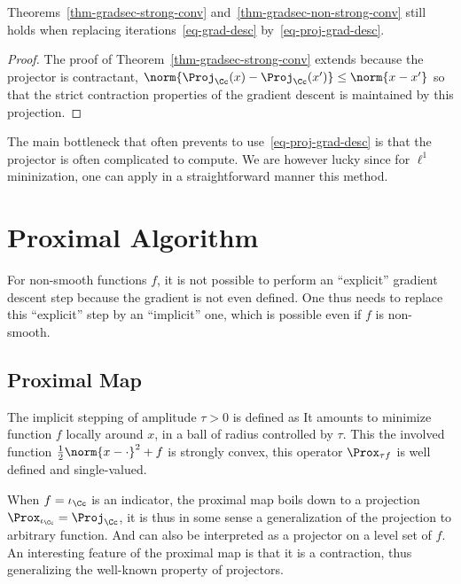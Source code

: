 \begin{thm}\label{thm-proj-grad}
	Theorems~\ref{thm-gradsec-strong-conv} and~\ref{thm-gradsec-non-strong-conv} still holds when replacing iterations~\eqref{eq-grad-desc} by~\eqref{eq-proj-grad-desc}.
\end{thm}

\begin{proof}
	The proof of Theorem~\ref{thm-gradsec-strong-conv} extends because the projector is contractant, 
	$\norm{\Proj_\Cc(x)-\Proj_\Cc(x')} \leq \norm{x-x'}$ so that the strict contraction properties of the gradient descent is maintained by this projection.   
\end{proof}

The main bottleneck that often prevents to use~\eqref{eq-proj-grad-desc} is that the projector is often complicated to compute. We are however lucky since for $\ell^1$ mininization, one can apply in a straightforward manner this method. 




\section{Proximal Algorithm}

For non-smooth functions $f$, it is not possible to perform an ``explicit'' gradient descent step because the gradient is not even defined. One thus needs to replace this ``explicit''  step by an ``implicit'' one, which is possible even if $f$ is non-smooth.


\subsection{Proximal Map }

The implicit stepping of amplitude $\tau>0$ is defined as 
It amounts to minimize function $f$ locally around $x$, in a ball of radius controlled by $\tau$.
%
This the involved function $\frac{1}{2}\norm{x-\cdot}^2 + f$ is strongly convex, this operator $\Prox_{\tau f}$ is well defined and single-valued. 

When $f=\iota_\Cc$ is an indicator, the proximal map boils down to a projection $\Prox_{\iota_\Cc}=\Proj_{\Cc}$, it is thus in some sense a generalization of the projection to arbitrary function. And can also be interpreted as a projector on a level set of $f$.  An interesting feature of the proximal map is that it is a contraction, thus generalizing the well-known property of projectors.


